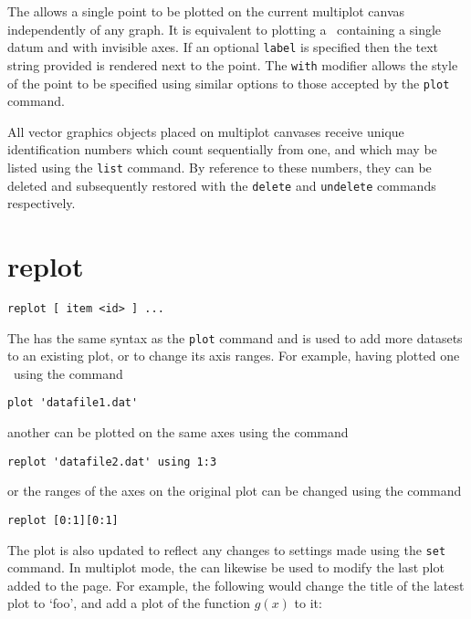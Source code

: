 The  allows a single point to be plotted on the current
multiplot canvas independently of any graph.  It is equivalent to plotting a
\datafile\ containing a single datum and with invisible axes.  If an optional
{\tt label} is specified then the text string provided is rendered next to the
point.  The {\tt with} modifier allows the style of the point to be specified
using similar options to those accepted by the {\tt plot} command.

All vector graphics objects placed on multiplot canvases receive unique
identification numbers which count sequentially from one, and which may be
listed using the {\tt list} command.  By reference to these numbers, they can
be deleted and subsequently restored with the {\tt delete} and {\tt undelete}
commands respectively.


\section{replot}

\begin{verbatim}
replot [ item <id> ] ...
\end{verbatim}

The  has the same syntax as the {\tt plot} command and is
used to add more datasets to an existing plot, or to change its axis ranges.
For example, having plotted one \datafile\ using the command

\begin{verbatim}
plot 'datafile1.dat'
\end{verbatim}

\noindent another can be plotted on the same axes using the command

\begin{verbatim}
replot 'datafile2.dat' using 1:3
\end{verbatim}

\noindent or the ranges of the axes on the original plot can be changed using
the command

\begin{verbatim}
replot [0:1][0:1]
\end{verbatim}

\noindent The plot is also updated to reflect any changes to settings made
using the {\tt set} command.  In multiplot mode, the  can
likewise be used to modify the last plot added to the page. For example, the
following would change the title of the latest plot to `foo', and add a plot of
the function $g(x)$ to it:

